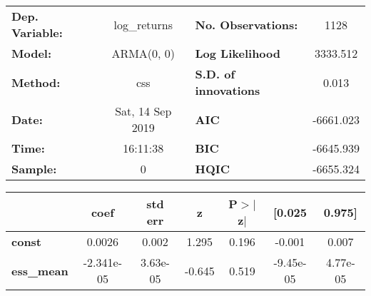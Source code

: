 \begin{center}
\begin{tabular}{lclc}
\toprule
\textbf{Dep. Variable:} &   log\_returns   & \textbf{  No. Observations:  } &    1128     \\
\textbf{Model:}         &    ARMA(0, 0)    & \textbf{  Log Likelihood     } &  3333.512   \\
\textbf{Method:}        &       css        & \textbf{  S.D. of innovations} &   0.013     \\
\textbf{Date:}          & Sat, 14 Sep 2019 & \textbf{  AIC                } & -6661.023   \\
\textbf{Time:}          &     16:11:38     & \textbf{  BIC                } & -6645.939   \\
\textbf{Sample:}        &        0         & \textbf{  HQIC               } & -6655.324   \\
\bottomrule
\end{tabular}
\begin{tabular}{lcccccc}
                   & \textbf{coef} & \textbf{std err} & \textbf{z} & \textbf{P$> |$z$|$} & \textbf{[0.025} & \textbf{0.975]}  \\
\midrule
\textbf{const}     &       0.0026  &        0.002     &     1.295  &         0.196        &       -0.001    &        0.007     \\
\textbf{ess\_mean} &   -2.341e-05  &     3.63e-05     &    -0.645  &         0.519        &    -9.45e-05    &     4.77e-05     \\
\bottomrule
\end{tabular}
\end{center}
